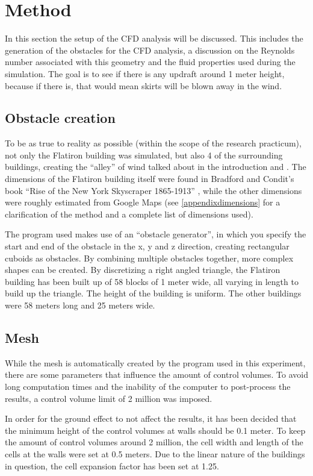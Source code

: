 \section{Method}
\label{method}
In this section the setup of the CFD analysis will be discussed. This includes the generation of the obstacles for the CFD analysis, a discussion on the Reynolds number associated with this geometry and the fluid properties used during the simulation. The goal is to see if there is any updraft around 1 meter height, because if there is, that would mean skirts will be blown away in the wind. 
\subsection{Obstacle creation}
\label{obstacles}
To be as true to reality as possible (within the scope of the research practicum), not only the Flatiron building was simulated, but also 4 of the surrounding buildings, creating the ``alley'' of wind talked about in the introduction and \cite{dresses}. The dimensions of the Flatiron building itself were found in Bradford and Condit's book ``Rise of the New York Skyscraper 1865-1913'' \cite{skyscraper}, while the other dimensions were roughly estimated from Google Maps (see \autoref{appendixdimensions} for a clarification of the method and a complete list of dimensions used). 

The program used makes use of an ``obstacle generator'', in which you specify the start and end of the obstacle in the x, y and z direction, creating rectangular cuboids as obstacles. By combining multiple obstacles together, more complex shapes can be created. By discretizing a right angled triangle, the Flatiron building has been built up of 58 blocks of 1 meter wide, all varying in length to build up the triangle. The height of the building is uniform. The other buildings were 58 meters long and 25 meters wide.

\subsection{Mesh}
\label{sec:mesh}
While the mesh is automatically created by the program used in this experiment, there are some parameters that influence the amount of control volumes. To avoid long computation times and the inability of the computer to post-process the results, a control volume limit of 2 million was imposed.

In order for the ground effect to not affect the results, it has been decided that the minimum height of the control volumes at walls should be 0.1 meter. To keep the amount of control volumes around 2 million, the cell width and length of the cells at the walls were set at 0.5 meters. Due to the linear nature of the buildings in question, the cell expansion factor has been set at 1.25.

